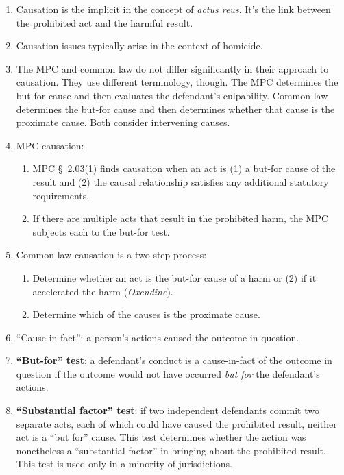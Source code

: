 \begin{enumerate}
    \item Causation is the implicit in the concept of \emph{actus reus}. It's the link between the prohibited act and the harmful result.
    \item Causation issues typically arise in the context of homicide.
    \item The MPC and common law do not differ significantly in their approach to causation. They use different terminology, though. The MPC determines the but-for cause and then evaluates the defendant's culpability. Common law determines the but-for cause and then determines whether that cause is the proximate cause. Both consider intervening causes.
    \item MPC causation:
    \begin{enumerate}
        \item MPC § 2.03(1) finds causation when an act is (1) a but-for cause of the result and (2) the causal relationship satisfies any additional statutory requirements.
        \item If there are multiple acts that result in the prohibited harm, the MPC subjects each to the but-for test.
    \end{enumerate}
    \item Common law causation is a two-step process:
    \begin{enumerate}
        \item Determine whether an act is the but-for cause of a harm or (2) if it accelerated the harm (\emph{Oxendine}).
        \item Determine which of the causes is the proximate cause.
    \end{enumerate}
    \item ``Cause-in-fact'': a person's actions caused the outcome in question.
    \item \textbf{``But-for'' test}: a defendant's conduct is a cause-in-fact of the outcome in question if the outcome would not have occurred \emph{but for} the defendant's actions.
    \item \textbf{``Substantial factor'' test}: if two independent defendants commit two separate acts, each of which could have caused the prohibited result, neither act is a ``but for'' cause. This test determines whether the action was nonetheless a ``substantial factor'' in bringing about the prohibited result. This test is used only in a minority of jurisdictions.
    \begin{enumerate}

\end{enumerate}
\end{enumerate}
